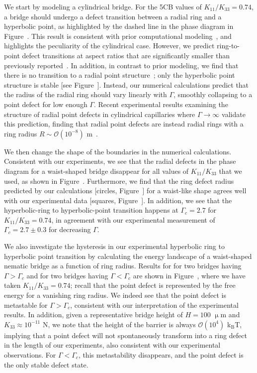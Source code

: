 We start by modeling a cylindrical bridge.
For the 5CB values of $K_{11}/K_{33} = 0.74$, a bridge should undergo a defect transition between a radial ring and a hyperbolic point, as highlighted by the dashed line in the phase diagram in Figure~.
This result is consistent with prior computational modeling~\cite{RN144}, and highlights the peculiarity of the cylindrical case.
However, we predict ring-to-point defect transitions at aspect ratios that are significantly smaller than previously reported~\cite{RN144}.
In addition, in contrast to prior modeling, we find that there is no transition to a radial point structure~\cite{RN144}; only the hyperbolic point structure is stable [see Figure~].
Instead, our numerical calculations predict that the radius of the radial ring should vary linearly with $\Gamma$, smoothly collapsing to a point defect for low enough $\Gamma$.
Recent experimental results examining the structure of radial point defects in cylindrical capillaries where $\Gamma \rightarrow \infty$ validate this prediction, finding that radial point defects are instead radial rings with a ring radius $R \sim \mathcal{O}(10^{-8})$ m~\cite{RN280}.

We then change the shape of the boundaries in the numerical calculations.
Consistent with our experiments, we see that the radial defects in the phase diagram for a waist-shaped bridge disappear for all values of $K_{11}/K_{33}$ that we used, as shown in Figure~.
Furthermore, we find that the ring defect radius predicted by our calculations [circles, Figure~] for a waist-like shape agrees well with our experimental data [squares, Figure~].
In addition, we see that the hyperbolic-ring to hyperbolic-point transition happens at $\Gamma_c = 2.7$ for $K_{11}/K_{33} = 0.74$, in agreement with our experimental measurement of $\Gamma_c = 2.7 \pm 0.3$ for decreasing $\Gamma$.

We also investigate the hysteresis in our experimental hyperbolic ring to hyperbolic point transition by calculating the energy landscape of a waist-shaped nematic bridge as a function of ring radius.
Results for for two bridges having $\Gamma > \Gamma_c$ and for two bridges having $\Gamma < \Gamma_c$ are shown in Figure~, where we have taken $K_{11}/K_{33} = 0.74$; recall that the point defect is represented by the free energy for a vanishing ring radius.
We indeed see that the point defect is metastable for $\Gamma > \Gamma_c$, consistent with our interpretation of the experimental results.
In addition, given a representative bridge height of $H = 100$ $\upmu$m and $K_{33} \approx 10^{-11}$ N, we note that the height of the barrier is always $\mathcal{O} \left ( 10^{4} \right )$ k$_\textrm{B}$T, implying that a point defect will not spontaneously transform into a ring defect in the length of our experiments, also consistent with our experimental observations.
For $\Gamma < \Gamma_c$, this metastability disappears, and the point defect is the only stable defect state.

